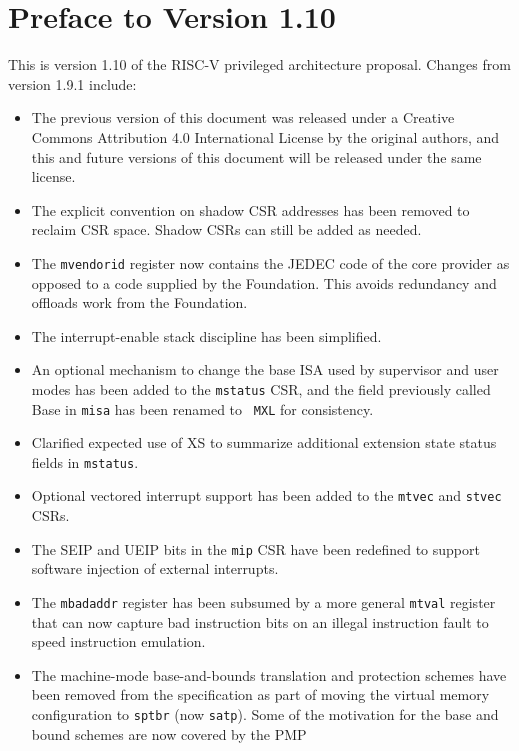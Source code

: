 \newpage

\section*{Preface to Version 1.10}

This is version 1.10 of the RISC-V privileged
architecture proposal.  Changes from version 1.9.1 include:

\begin{itemize}
  \parskip 0pt
  \itemsep 1pt
\item The previous version of this document was released under a
  Creative Commons Attribution 4.0 International License by the
  original authors, and this and future versions of this document will
  be released under the same license.
\item The explicit convention on shadow CSR addresses has been removed
  to reclaim CSR space.  Shadow CSRs can still be added as needed.
\item The {\tt mvendorid} register now contains the JEDEC code of the
  core provider as opposed to a code supplied by the Foundation.  This
  avoids redundancy and offloads work from the Foundation.
\item The interrupt-enable stack discipline has been simplified.
\item An optional mechanism to change the base ISA used by supervisor
  and user modes has been added to the {\tt mstatus} CSR, and the
  field previously called Base in {\tt misa} has been renamed to {\tt
    MXL} for consistency.
\item Clarified expected use of XS to summarize additional extension
  state status fields in {\tt mstatus}.
\item Optional vectored interrupt support has been added to the
  {\tt mtvec} and {\tt stvec} CSRs.
\item The SEIP and UEIP bits in the {\tt mip} CSR have been redefined
  to support software injection of external interrupts.
  \item The {\tt mbadaddr} register has been subsumed by a more
    general {\tt mtval} register that can now capture bad
    instruction bits on an illegal instruction fault to speed
    instruction emulation.
\item The machine-mode base-and-bounds translation and protection
  schemes have been removed from the specification as part of moving
  the virtual memory configuration to {\tt sptbr} (now {\tt satp}).  Some of the
  motivation for the base and bound schemes are now covered by the PMP

\end{itemize}

